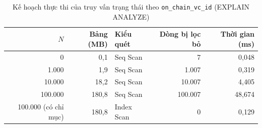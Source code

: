 \begin{table}[H]
\centering
\caption{Kế hoạch thực thi của truy vấn trạng thái theo \texttt{on\_chain\_vc\_id} (EXPLAIN ANALYZE)}
\label{tab:v2-explain}
\renewcommand{\arraystretch}{1.2}
\small
\begin{tabular}{|r|r|l|r|r|}
\hline
\textbf{$N$} & \textbf{Bảng (MB)} & \textbf{Kiểu quét} & \textbf{Dòng bị lọc bỏ} & \textbf{Thời gian (ms)} \\ \hline
0 & 0{,}1 & Seq Scan & 7 & 0{,}048 \\ \hline
1.000 & 1{,}9 & Seq Scan & 1.007 & 0{,}319 \\ \hline
10.000 & 18{,}2 & Seq Scan & 10.007 & 4{,}405 \\ \hline
100.000 & 180{,}8 & Seq Scan & 100.007 & 48{,}674 \\ \hline
100.000 (có chỉ mục) & 180{,}8 & Index Scan & 0 & 0{,}129 \\ \hline
\end{tabular}
\end{table}
